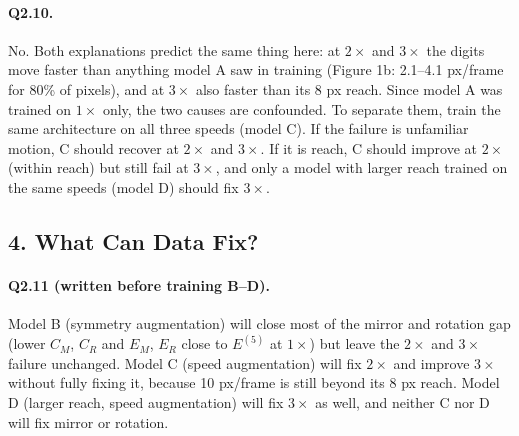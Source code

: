 \paragraph{Q2.10.} No. Both explanations predict the same thing here: at $2\times$ and $3\times$ the digits move faster than anything model A saw in training (Figure 1b: 2.1--4.1 px/frame for 80\% of pixels), and at $3\times$ also faster than its 8 px reach. Since model A was trained on $1\times$ only, the two causes are confounded. To separate them, train the same architecture on all three speeds (model C). If the failure is unfamiliar motion, C should recover at $2\times$ and $3\times$. If it is reach, C should improve at $2\times$ (within reach) but still fail at $3\times$, and only a model with larger reach trained on the same speeds (model D) should fix $3\times$.

\subsection*{4. What Can Data Fix?}

\paragraph{Q2.11 (written before training B--D).} Model B (symmetry augmentation) will close most of the mirror and rotation gap (lower $C_M$, $C_R$ and $E_M$, $E_R$ close to $E^{(5)}$ at $1\times$) but leave the $2\times$ and $3\times$ failure unchanged. Model C (speed augmentation) will fix $2\times$ and improve $3\times$ without fully fixing it, because 10 px/frame is still beyond its 8 px reach. Model D (larger reach, speed augmentation) will fix $3\times$ as well, and neither C nor D will fix mirror or rotation.

